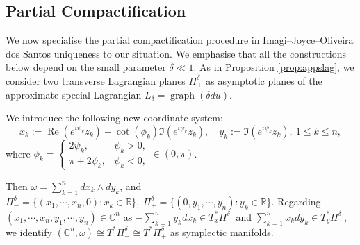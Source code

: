 \documentclass[11pt,a4paper]{article}
\numberwithin{equation}{section}%
\theoremstyle{definition}
\newcommand{\R}{\mathbb{R}}
\newcommand{\C}{\mathbb{C}}
\begin{document}
\subsection{Partial Compactification}
\label{sec:partialcompact}
 We now specialise the partial compactification procedure in Imagi--Joyce--Oliveira dos Santos uniqueness \cite{IJS} to our situation. We emphasise that all the constructions below depend on the small parameter $\delta\ll 1$. As in Proposition \ref{prop:appslag}, we consider two transverse Lagrangian planes $\Pi_\pm^\delta$ as asymptotic planes of the approximate special Lagrangian $L_\delta=\operatorname{graph}(\delta du)$. 
   
   We introduce the following new coordinate system:
    \begin{equation}
        \label{eqn:coorchangepartialcompact}
        x_k:=\operatorname{Re}(e^{i\psi_k}z_k)-\cot(\phi_k)\Im (e^{i\psi_k}z_k),\quad y_k:=\Im (e^{i\psi_k}z_k),~1\leqslant k\leqslant n,
    \end{equation}
    where $\phi_k=\left\{\begin{array}{ll}
      2\psi_k,   &  \psi_k>0, \\
       \pi+2\psi_k,  & \psi_k<0,
    \end{array}\right.\in (0,\pi)$.
    
    Then $\omega=\sum\limits_{k=1}^n dx_k\wedge dy_k$, and $\Pi_-^\delta=\{(x_1,\cdots,x_n,0):x_k\in \R\},~\Pi_+^\delta=\{(0,y_1,\cdots,y_n):y_k\in \R\}$. Regarding $(x_1,\cdots,x_n,y_1,\cdots,y_n)\in \C^n$ as $-\sum\limits_{k=1}^n y_kdx_k\in T^*_{x}\Pi_-^\delta$ and $\sum\limits_{k=1}^n x_kdy_k \in T^*_y\Pi_+^\delta$, we identify $(\C^n,\omega)\cong T^*\Pi_-^\delta\cong T^*\Pi_+^\delta$ as symplectic manifolds. 
\end{document}

